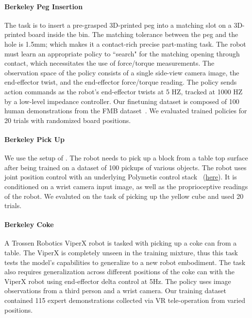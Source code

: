 \begin{appendices}
\paragraph{Berkeley Peg Insertion} The task is to insert a pre-grasped 3D-printed peg into a matching slot on a 3D-printed board inside the bin. The matching tolerance between the peg and the hole is 1.5mm; which makes it a contact-rich precise part-mating task. 
The robot must learn an appropriate policy to ``search" for the matching opening through contact, which necessitates the use of force/torque measurements. The observation space of the policy consists of a single side-view camera image, the end-effector twist, and the end-effector force/torque reading. The policy sends action commands as the robot's end-effector twists at 5 HZ, tracked at 1000 HZ by a low-level impedance controller. Our finetuning dataset is composed of 100 human demonstrations from the FMB dataset~\citep{luo2023fmb}. We evaluated trained policies for 20 trials with randomized board positions.

\paragraph{Berkeley Pick Up} We use the setup of \citet{radosavovic2023robot}. The robot needs to pick up a block from a table top surface after being trained on a dataset of 100 pickups of various objects. The robot uses joint position control with an underlying Polymetis control stack~\citep{Polymetis2021} (\href{https://github.com/jhejna/robot-lightning}{here}). It is conditioned on a wrist camera input image, as well as the proprioceptive readings of the robot. We evaluted on the task of picking up the yellow cube and used 20 trials.

\paragraph{Berkeley Coke} A Trossen Robotics ViperX robot is tasked with picking up a coke can from a table. The ViperX is completely unseen in the training mixture, thus this task tests the model's capabilities to generalize to a new robot embodiment. The task also requires generalization across different positions of the coke can with the ViperX robot using end-effector delta control at 5Hz.
The policy uses image observations from a third person and a wrist camera. Our training dataset contained 115 expert demonstrations collected via VR tele-operation from varied positions.


\end{appendices}
